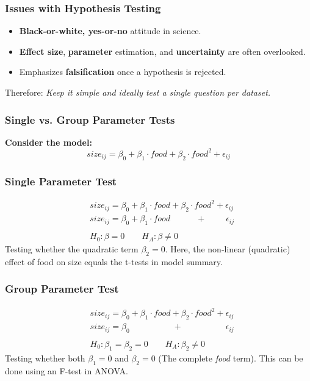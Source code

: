 \documentclass{beamer}
\begin{document}
\begin{frame}
    \frametitle{Issues with Hypothesis Testing}
    \Large
    \begin{itemize}
        \item \textbf{Black-or-white, yes-or-no} attitude in science.
        \item \textbf{Effect size}, \textbf{parameter} estimation, and \textbf{uncertainty} are often overlooked.
        \item Emphasizes \textbf{falsification} once a hypothesis is rejected.
    \end{itemize}
    \vspace{0.3cm}
    Therefore: \textit{Keep it simple and ideally test a single question per dataset.}
\end{frame}

\begin{frame}
    \frametitle{Single vs. Group Parameter Tests}
    \Large
    \textbf{Consider the model:}
    \[
    size_{ij} = \beta_0 + \beta_1 \cdot food + \beta_2 \cdot food^2 + \epsilon_{ij}
    \]
\end{frame}

\begin{frame}
    \frametitle{Single Parameter Test}
    \Large
    \begin{align*}
    &size_{ij} = \beta_0 + \beta_1 \cdot food + \beta_2 \cdot food^2 + \epsilon_{ij}\\
    &size_{ij} = \beta_0 + \beta_1 \cdot food \quad \qquad + \; \qquad \epsilon_{ij}\\
    \\
    &H_0: \beta = 0 \qquad H_A: \beta \neq 0
    \end{align*}
    Testing whether the quadratic term $\beta_2 = 0$. Here, the non-linear (quadratic) effect of food on size equals the t-tests in model summary.
\end{frame}

\begin{frame}
    \frametitle{Group Parameter Test}
    \Large
    \begin{align*}
    &size_{ij} = \beta_0 + \beta_1 \cdot food + \beta_2 \cdot food^2 + \epsilon_{ij}\\
    &size_{ij} = \beta_0 \qquad \qquad \quad + \quad \qquad \qquad \epsilon_{ij}\\
    \\
    &H_0: \beta_1 = \beta_2 = 0 \qquad H_A: \beta_2 \neq 0
    \end{align*}
    Testing whether both $\beta_1 = 0$ and $\beta_2 = 0$ (The complete \textit{food} term). This can be done using an F-test in ANOVA.
\end{frame}
\end{document}

